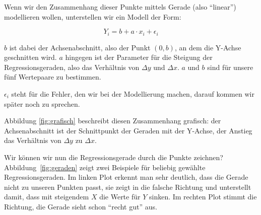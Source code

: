 \documentclass[ngerman, 12pt]{scrartcl}
\begin{document}
Wenn wir den Zusammenhang dieser Punkte mittels Gerade (also \enquote{linear}) modellieren wollen, unterstellen wir ein Modell der Form: 
   
\begin{equation}
	 Y_i = b + a \cdot x_i + \epsilon_i
\end{equation}

\begin{center}
\label{fig:grafisch}
\end{center}

\(b\) ist dabei der Achsenabschnitt, also der Punkt \((0,b)\), an dem die Y-Achse geschnitten wird. $a$ hingegen ist der Parameter für die Steigung der Regressionsgeraden, also das Verhältnis von $\Delta y$ und $\Delta x$. $a$ und $b$ sind für unsere fünf Wertepaare zu bestimmen. 

\(\epsilon_i\) steht für die Fehler, den wir bei der Modellierung machen, darauf kommen wir später noch zu sprechen. 

Abbildung \ref{fig:grafisch} beschreibt diesen Zusammenhang grafisch: der Achsenabschnitt ist der Schnittpunkt der Geraden mit der Y-Achse, der Anstieg das Verhältnis von \(\Delta y\) zu \(\Delta x\).

Wir können wir nun die Regressionsgerade durch die Punkte zeichnen? Abbildung~\ref{fig:geraden} zeigt zwei Beispiele für beliebig gewählte Regressionsgeraden. Im linken Plot erkennt man sehr deutlich, dass die Gerade nicht zu unseren Punkten passt, sie zeigt in die falsche Richtung und unterstellt damit, dass mit steigendem $X$ die Werte für $Y$ sinken. Im rechten Plot stimmt die Richtung, die Gerade sieht schon \enquote{recht gut} aus. 
\end{document}
